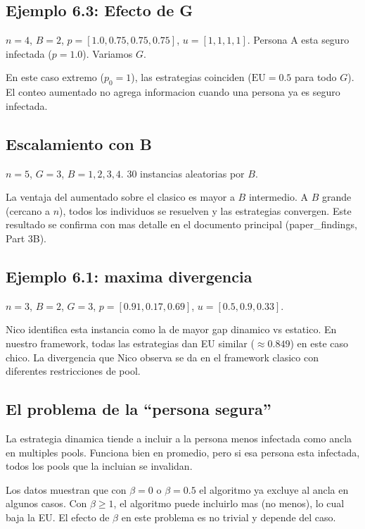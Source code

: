\documentclass[11pt]{article}
\begin{document}
\subsection{Ejemplo 6.3: Efecto de G}

$n=4$, $B=2$, $p = [1.0, 0.75, 0.75, 0.75]$, $u = [1, 1, 1, 1]$.
Persona A esta seguro infectada ($p=1.0$). Variamos $G$.

En este caso extremo ($p_0 = 1$), las estrategias coinciden
($\text{EU} = 0.5$ para todo $G$).
El conteo aumentado no agrega informacion cuando una persona
ya es seguro infectada.

\subsection{Escalamiento con B}

$n=5$, $G=3$, $B = 1, 2, 3, 4$. 30 instancias aleatorias por $B$.

La ventaja del aumentado sobre el clasico es mayor a $B$ intermedio.
A $B$ grande (cercano a $n$), todos los individuos se resuelven
y las estrategias convergen.
Este resultado se confirma con mas detalle en el documento principal
(paper\_findings, Part 3B).

\subsection{Ejemplo 6.1: maxima divergencia}

$n=3$, $B=2$, $G=3$, $p = [0.91, 0.17, 0.69]$, $u = [0.5, 0.9, 0.33]$.

Nico identifica esta instancia como la de mayor gap dinamico vs estatico.
En nuestro framework, todas las estrategias dan EU similar ($\approx 0.849$)
en este caso chico.
La divergencia que Nico observa se da en el framework clasico con
diferentes restricciones de pool.

\subsection{El problema de la ``persona segura''}

La estrategia dinamica tiende a incluir a la persona menos infectada
como ancla en multiples pools.
Funciona bien en promedio, pero si esa persona esta infectada,
todos los pools que la incluian se invalidan.

Los datos muestran que con $\beta = 0$ o $\beta = 0.5$ el algoritmo
ya excluye al ancla en algunos casos.
Con $\beta \geq 1$, el algoritmo puede incluirlo mas (no menos),
lo cual baja la EU.
El efecto de $\beta$ en este problema es no trivial y depende del caso.
\end{document}
